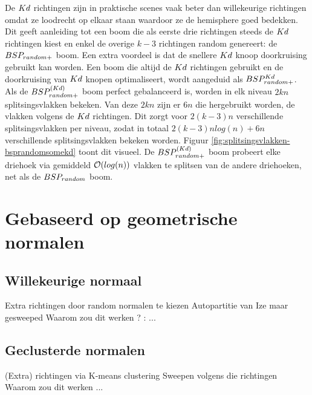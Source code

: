 De $Kd$ richtingen zijn in praktische scenes vaak beter dan willekeurige richtingen omdat ze loodrecht op elkaar staan waardoor ze de hemisphere goed bedekken.
Dit geeft aanleiding tot een boom die als eerste drie richtingen steeds de $Kd$ richtingen kiest en enkel de overige $k - 3$ richtingen random genereert: de $BSP_{random+}$ boom. Een extra voordeel is dat de snellere $Kd$ knoop doorkruising gebruikt kan worden. Een boom die altijd de $Kd$ richtingen gebruikt en de doorkruising van $Kd$ knopen optimaliseert, wordt aangeduid als $BSP^{Kd}_{random+}$. 
Als de $BSP^{(Kd)}_{random+}$ boom perfect gebalanceerd is, worden in elk niveau $2kn$ splitsingsvlakken bekeken.
Van deze $2kn$ zijn er $6n$ die hergebruikt worden, de vlakken volgens de $Kd$ richtingen.
Dit zorgt voor $2(k-3)n$ verschillende splitsingsvlakken per niveau, zodat in totaal $2(k-3)nlog(n) + 6n$ verschillende splitsingsvlakken bekeken worden.
Figuur \ref{fig:splitsingsvlakken-bsprandomsomekd} toont dit visueel.
De $BSP^{(Kd)}_{random+}$ boom probeert elke driehoek via gemiddeld $\mathcal{O}(log(n))$ vlakken te splitsen van de andere driehoeken, net als  de $BSP_{random}$ boom.\\



\section{Gebaseerd op geometrische normalen}
\subsection{Willekeurige normaal}
    Extra richtingen door random normalen te kiezen
    Autopartitie van Ize maar gesweeped
    Waarom zou dit werken ? : ...
    
\subsection{Geclusterde normalen}
    (Extra) richtingen via K-means clustering
    Sweepen volgens die richtingen
    Waarom zou dit werken ...



